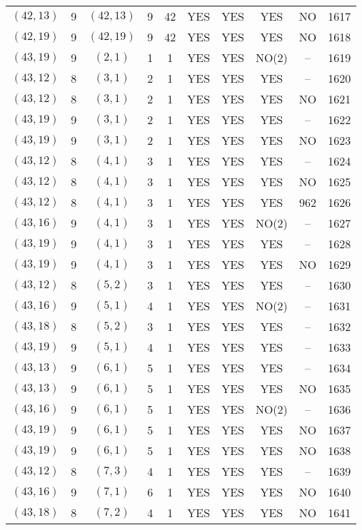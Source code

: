 \begin{longtable}{|c|c|c|c|c|c|c|c|c|c|}
$(42, 13)$ & 9 & $(42, 13)$ & 9 & 42 & YES & YES & YES & NO & 1617\\
$(42, 19)$ & 9 & $(42, 19)$ & 9 & 42 & YES & YES & YES & NO & 1618\\
$(43, 19)$ & 9 & $(2, 1)$ & 1 & 1 & YES & YES & NO(2) & -- & 1619\\
$(43, 12)$ & 8 & $(3, 1)$ & 2 & 1 & YES & YES & YES & -- & 1620\\
$(43, 12)$ & 8 & $(3, 1)$ & 2 & 1 & YES & YES & YES & NO & 1621\\
$(43, 19)$ & 9 & $(3, 1)$ & 2 & 1 & YES & YES & YES & -- & 1622\\
$(43, 19)$ & 9 & $(3, 1)$ & 2 & 1 & YES & YES & YES & NO & 1623\\
$(43, 12)$ & 8 & $(4, 1)$ & 3 & 1 & YES & YES & YES & -- & 1624\\
$(43, 12)$ & 8 & $(4, 1)$ & 3 & 1 & YES & YES & YES & NO & 1625\\
$(43, 12)$ & 8 & $(4, 1)$ & 3 & 1 & YES & YES & YES & 962 & 1626\\
$(43, 16)$ & 9 & $(4, 1)$ & 3 & 1 & YES & YES & NO(2) & -- & 1627\\
$(43, 19)$ & 9 & $(4, 1)$ & 3 & 1 & YES & YES & YES & -- & 1628\\
$(43, 19)$ & 9 & $(4, 1)$ & 3 & 1 & YES & YES & YES & NO & 1629\\
$(43, 12)$ & 8 & $(5, 2)$ & 3 & 1 & YES & YES & YES & -- & 1630\\
$(43, 16)$ & 9 & $(5, 1)$ & 4 & 1 & YES & YES & NO(2) & -- & 1631\\
$(43, 18)$ & 8 & $(5, 2)$ & 3 & 1 & YES & YES & YES & -- & 1632\\
$(43, 19)$ & 9 & $(5, 1)$ & 4 & 1 & YES & YES & YES & -- & 1633\\
$(43, 13)$ & 9 & $(6, 1)$ & 5 & 1 & YES & YES & YES & -- & 1634\\
$(43, 13)$ & 9 & $(6, 1)$ & 5 & 1 & YES & YES & YES & NO & 1635\\
$(43, 16)$ & 9 & $(6, 1)$ & 5 & 1 & YES & YES & NO(2) & -- & 1636\\
$(43, 19)$ & 9 & $(6, 1)$ & 5 & 1 & YES & YES & YES & NO & 1637\\
$(43, 19)$ & 9 & $(6, 1)$ & 5 & 1 & YES & YES & YES & NO & 1638\\
$(43, 12)$ & 8 & $(7, 3)$ & 4 & 1 & YES & YES & YES & -- & 1639\\
$(43, 16)$ & 9 & $(7, 1)$ & 6 & 1 & YES & YES & YES & NO & 1640\\
$(43, 18)$ & 8 & $(7, 2)$ & 4 & 1 & YES & YES & YES & NO & 1641\\

\end{longtable}
